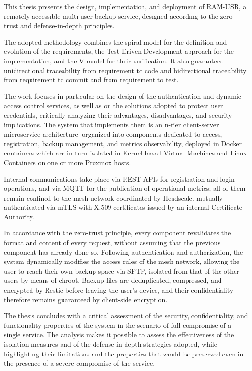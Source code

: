 \abstract
This thesis presents the design, implementation, and deployment of RAM-USB,
a remotely accessible multi-user backup service, designed according to the zero-trust and
defense-in-depth principles.

The adopted methodology combines the spiral model for the definition and evolution of the requirements, 
the Test-Driven Development approach for the implementation, and the V-model for their verification. 
It also guarantees unidirectional traceability from requirement to code and bidirectional traceability from requirement
to commit and from requirement to test.

The work focuses in particular on the design of the authentication and dynamic access control
services, as well as on the solutions adopted to protect user credentials, critically analyzing
their advantages, disadvantages, and security implications. The system that implements them is
an n-tier client-server microservice architecture, organized into components dedicated to access,
registration, backup management, and metrics observability, deployed in Docker containers
which are in turn isolated in Kernel-based Virtual Machines and Linux Containers on one or more Proxmox hosts.

Internal communications take place via REST APIs for registration and login operations, and via 
MQTT for the publication of operational metrics; all of them remain confined to the mesh network coordinated by 
Headscale, mutually authenticated via mTLS with X.509 certificates issued by an internal 
Certificate-Authority.

In accordance with the zero-trust principle, every component revalidates the format and content
of every request, without assuming that the previous component has already done so. Following
authentication and authorization, the system dynamically modifies the access rules of the mesh
network, allowing the user to reach their own backup space via SFTP, isolated from that
of the other users by means of chroot. Backup files are deduplicated, compressed, and encrypted by
Restic before leaving the user's device, and their confidentiality therefore remains guaranteed by
client-side encryption.

The thesis concludes with a critical assessment of the security, confidentiality, and functionality properties
of the system in the scenario of full compromise of a single service. The analysis makes it possible to assess
the effectiveness of the isolation measures and of the defense-in-depth strategies adopted, while highlighting
their limitations and the properties that would be preserved even in the presence of a severe compromise
of the service.
